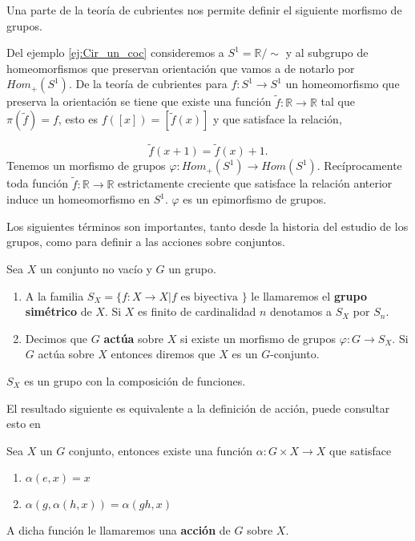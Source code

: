 Una parte de la teoría de cubrientes nos permite definir el siguiente morfismo de grupos.

\begin{ej}
Del ejemplo \ref{ej:Cir_un_coc} consideremos a $S^1=\mathbb{R}/\sim$ y al subgrupo de homeomorfismos que preservan orientación que vamos a de notarlo por $Hom_+(S^1)$. De la teoría de cubrientes para $f: S^1 \to S^1$ un homeomorfismo que preserva la orientación se tiene que existe una función $\tilde{f}:\mathbb{R} \to \mathbb{R}$ tal que $\pi(\tilde{f})=f$, esto es $f([x])=[\tilde{f}(x)]$ y que satisface la relación,

$$\tilde{f}(x+1)=\tilde{f}(x)+1.$$
Tenemos un morfismo de grupos $\varphi: Hom_+(S^1) \to Hom(S^1)$. 
Recíprocamente toda función  $\tilde{f}:\mathbb{R} \to \mathbb{R}$ estrictamente  creciente que satisface la relación anterior induce un homeomorfismo en $S^1.$ $\varphi$ es un epimorfismo de grupos. 

\end{ej}
	
	Los siguientes términos son importantes, tanto desde la historia del estudio de los grupos, como para definir a las acciones sobre conjuntos.	
	
	\begin{df}
	Sea $X$ un conjunto no vacío y $G$ un grupo.
	\begin{enumerate}
	\item A la familia $S_X=\{f:X \to X| f \text{ es biyectiva } \}$ le llamaremos el \textbf{grupo simétrico} de $X$. Si $X$ es finito de cardinalidad $n$ denotamos a $S_X$ por $S_n$.
	\item Decimos que $G$ \textbf{actúa} sobre $X$ si existe un morfismo de grupos $\varphi:G \to S_X$.  Si $G$ actúa sobre $X$ entonces diremos que $X$ es un $G$-conjunto.
	\end{enumerate}
	
	\end{df}
	
	\begin{nt}
	$S_X$ es un grupo con la composición de funciones. 
	\end{nt}	
	El resultado siguiente es equivalente a la definición de acción, puede consultar esto en 
	\begin{te}
	Sea $X$ un $G$ conjunto, entonces existe una función $\alpha:G \times X \to X$ que satisface
	\begin{enumerate}
	\item $\alpha(e,x)=x$
	\item $\alpha(g,\alpha(h,x))=\alpha(gh,x)$
	\end{enumerate}
	A dicha función le llamaremos una \textbf{acción} de $G$ sobre $X$.
	\end{te}
	
